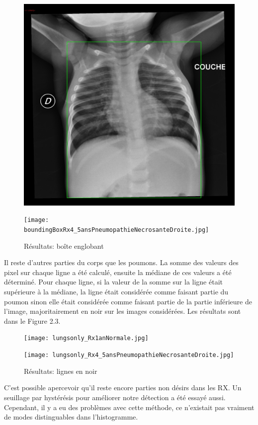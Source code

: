\documentclass[a4paper,12pt]{report}
\begin{document}
\begin{figure}[ht]
	\begin{minipage}[b]{.5\textwidth}
		\centering
		\includegraphics[scale=0.10]{boundingBoxRx1anNormale.jpg}
	\end{minipage}
	\hfill
	\begin{minipage}[b]{.46\textwidth}
		\centering
		\texttt{[image: boundingBoxRx4\_5ansPneumopathieNecrosanteDroite.jpg]}
	\end{minipage}
	\caption{Résultats: boîte englobant}
\end{figure}


Il reste d’autres  parties  du  corps  que les  poumons. La somme des valeurs des pixel sur chaque ligne a été calculé, ensuite la médiane de ces valeurs a été déterminé. Pour chaque ligne, si la valeur de  la  somme  sur  la  ligne  était  supérieure  à  la  médiane,  la  ligne  était  considérée  comme faisant  partie  du  poumon  sinon  elle  était  considérée  comme  faisant  partie  de  la  partie inférieure de l’image, majoritairement en noir sur les images considérées. Les résultats sont dans le Figure 2.3.

\begin{figure}[ht]
	\begin{minipage}[b]{.5\textwidth}
		\centering
		\texttt{[image: lungsonly\_Rx1anNormale.jpg]}
	\end{minipage}
	\hfill
	\begin{minipage}[b]{.46\textwidth}
		\centering
		\texttt{[image: lungsonly\_Rx4\_5ansPneumopathieNecrosanteDroite.jpg]}
	\end{minipage}
	\caption{Résultats: lignes en noir}
\end{figure}
C'est possible apercevoir qu'il reste encore parties non désirs dans les RX. Un seuillage par hystérésis pour améliorer notre détection a été essayé aussi. Cependant, il y a eu des problèmes avec cette méthode, ce n'existait pas vraiment de modes distinguables dans l’histogramme.
\end{document}
